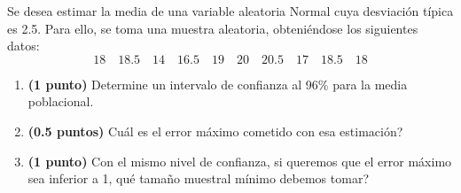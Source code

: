 
Se desea estimar la media de una variable aleatoria Normal cuya desviación típica es 2.5. Para ello, se toma una muestra aleatoria, obteniéndose los siguientes datos:
\[
18\quad18.5\quad14\quad16.5\quad19\quad20\quad20.5\quad17\quad18.5\quad18
\]
\begin{enumerate}[label=\alph*)]
\item \textbf{(1 punto)} Determine un intervalo de confianza al 96\% para la media poblacional.
\item \textbf{(0.5 puntos)} \textquestiondown{}Cuál es el error máximo cometido con esa estimación?
\item \textbf{(1 punto)} Con el mismo nivel de confianza, si queremos que el error máximo sea inferior a 1, \textquestiondown{}qué tamaño muestral mínimo debemos tomar?
\end{enumerate}
